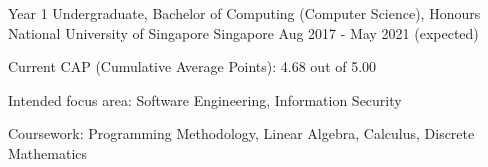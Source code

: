 

\begin{cventries}

  \cventry
    {Year 1 Undergraduate, Bachelor of Computing (Computer Science), Honours} %
    {National University of Singapore} %
    {Singapore} %
    {Aug 2017 - May 2021 (expected)} %
    {
      \begin{cvitems} %
        \item {Current CAP (Cumulative Average Points): 4.68 out of 5.00}
        \item {Intended focus area: Software Engineering, Information Security}
        \item {Coursework: Programming Methodology, Linear Algebra, Calculus, Discrete Mathematics}
      \end{cvitems}
    }

\end{cventries}
